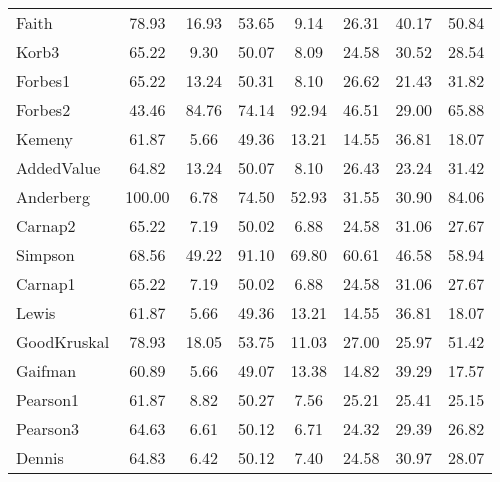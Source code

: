 \begin{tabular}{l||c|c|c|c|c|c|c}
Faith& 78.93& 16.93& 53.65& 9.14& 26.31& 40.17& 50.84\\
Korb3& 65.22& 9.30& 50.07& 8.09& 24.58& 30.52& 28.54\\
Forbes1& 65.22& 13.24& 50.31& 8.10& 26.62& 21.43& 31.82\\
Forbes2& 43.46& 84.76& 74.14& 92.94& 46.51& 29.00& 65.88\\
Kemeny& 61.87& 5.66& 49.36& 13.21& 14.55& 36.81& 18.07\\
AddedValue& 64.82& 13.24& 50.07& 8.10& 26.43& 23.24& 31.42\\
Anderberg& 100.00& 6.78& 74.50& 52.93& 31.55& 30.90& 84.06\\
Carnap2& 65.22& 7.19& 50.02& 6.88& 24.58& 31.06& 27.67\\
Simpson& 68.56& 49.22& 91.10& 69.80& 60.61& 46.58& 58.94\\
Carnap1& 65.22& 7.19& 50.02& 6.88& 24.58& 31.06& 27.67\\
Lewis& 61.87& 5.66& 49.36& 13.21& 14.55& 36.81& 18.07\\
GoodKruskal& 78.93& 18.05& 53.75& 11.03& 27.00& 25.97& 51.42\\
Gaifman& 60.89& 5.66& 49.07& 13.38& 14.82& 39.29& 17.57\\
Pearson1& 61.87& 8.82& 50.27& 7.56& 25.21& 25.41& 25.15\\
Pearson3& 64.63& 6.61& 50.12& 6.71& 24.32& 29.39& 26.82\\
Dennis& 64.83& 6.42& 50.12& 7.40& 24.58& 30.97& 28.07\\
\end{tabular}